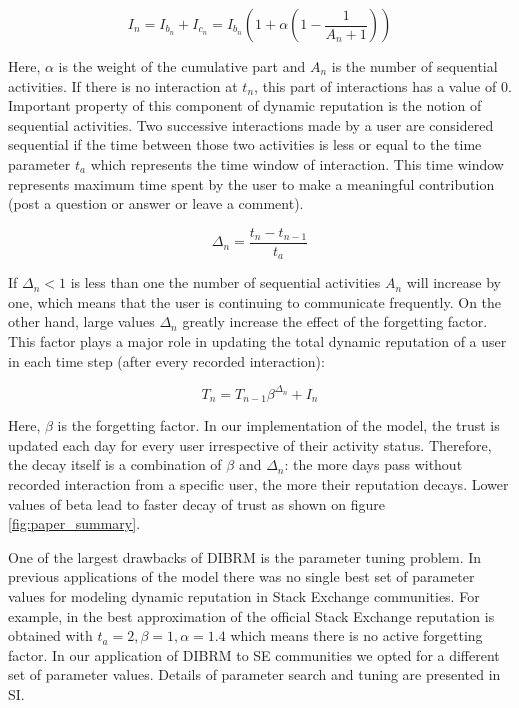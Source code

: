 \begin{equation}\label{eq:ibn}
I_n = I_{b_{n}} + I_{c_{n}} = I_{b_{n}} (1+  \alpha  (1-\frac{1}{A_{n}+1}))
\end{equation}

Here, $\alpha$ is the weight of the cumulative part and $A_{n}$ is the number of sequential activities. If there is no interaction at $t_n$, this part of interactions has a value of 0. Important property of this component of dynamic reputation is the notion of sequential activities. Two successive interactions made by a user are considered sequential if the time between those two activities is less or equal to the time parameter $t_{a}$ which represents the time window of interaction. This time window represents maximum time spent by the user to make a meaningful contribution (post a question or answer or leave a comment).

\begin{equation}\label{eq:deltan}
\Delta_{n}=\frac{t_{n}-t_{n-1}}{t_{a}}
\end{equation}

If $\Delta_{n} < 1$ is less than one the number of sequential activities $A_{n}$ will increase by one, which means that the user is continuing to communicate frequently. On the other hand, large values $\Delta_{n}$ greatly increase the effect of the forgetting factor. This factor plays a major role in updating the total dynamic reputation of a user in each time step (after every recorded interaction):

\begin{equation}\label{eq:tn}
T_{n}=T_{n-1} \beta^{\Delta_{n}}+I_{n}
\end{equation}

Here, $\beta$ is the forgetting factor. In our implementation of the model, the trust is updated each day for every user irrespective of their activity status. Therefore, the decay itself is a combination of $\beta$ and $\Delta_n$: the more days pass without recorded interaction from a specific user, the more their reputation decays. Lower values of beta lead to faster decay of trust as shown on figure \ref{fig:paper_summary}.


One of the largest drawbacks of DIBRM is the parameter tuning problem. In previous applications of the model \cite{melnikovDynamicInteractionBasedReputation2018,yashkina2020} there was no single best set of parameter values for modeling dynamic reputation in Stack Exchange communities. For example, in \cite{yashkina2020} the best approximation of the official Stack Exchange reputation is obtained with $t_a =2, \beta = 1, \alpha = 1.4$ which means there is no active forgetting factor. In our application of DIBRM to SE communities we opted for a different set of parameter values. Details of parameter search and tuning are presented in SI.

